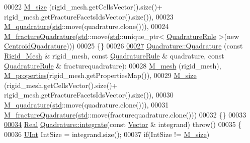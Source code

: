 \begin{DoxyCode}
00022     \hyperlink{classFVCode3D_1_1Quadrature_ae0ab248f031fa026887c4e1fb91a3835}{M\_size} (rigid\_mesh.getCellsVector().size()+ rigid\_mesh.getFractureFacetsIdsVector().size()),
00023     \hyperlink{classFVCode3D_1_1Quadrature_a9a128b9525429cca80435552ee3b6e56}{M\_quadrature}(\hyperlink{namespacestd}{std}::move(quadrature.clone())),
00024     \hyperlink{classFVCode3D_1_1Quadrature_afc75e45ee2a0a8be3cd39f93c2ef0b7e}{M\_fractureQuadrature}(\hyperlink{namespacestd}{std}::move(\hyperlink{namespacestd}{std}::unique\_ptr<
      \hyperlink{classFVCode3D_1_1QuadratureRule}{QuadratureRule} >(new \hyperlink{classFVCode3D_1_1CentroidQuadrature}{CentroidQuadrature})))
00025 \{\}
00026 
\hypertarget{Quadrature_8cpp_source.tex_l00027}{}\hyperlink{classFVCode3D_1_1Quadrature_a5f61238ba1001ac521cae0ec308b601f}{00027} \hyperlink{classFVCode3D_1_1Quadrature_aefb925716304b6546c5aeba01fab383a}{Quadrature::Quadrature} (\textcolor{keyword}{const} \hyperlink{classFVCode3D_1_1Rigid__Mesh}{Rigid\_Mesh} & rigid\_mesh, \textcolor{keyword}{const} 
      \hyperlink{classFVCode3D_1_1QuadratureRule}{QuadratureRule} & quadrature, \textcolor{keyword}{const} \hyperlink{classFVCode3D_1_1QuadratureRule}{QuadratureRule} & fracturequadrature):
00028     \hyperlink{classFVCode3D_1_1Quadrature_abaa2519ea32065df30242bd5f5cb2d01}{M\_mesh} (rigid\_mesh), \hyperlink{classFVCode3D_1_1Quadrature_ace6cd23087209d3186ae173c265cde39}{M\_properties}(rigid\_mesh.getPropertiesMap()),
00029     \hyperlink{classFVCode3D_1_1Quadrature_ae0ab248f031fa026887c4e1fb91a3835}{M\_size} (rigid\_mesh.getCellsVector().size()+ rigid\_mesh.getFractureFacetsIdsVector().size()),
00030     \hyperlink{classFVCode3D_1_1Quadrature_a9a128b9525429cca80435552ee3b6e56}{M\_quadrature}(\hyperlink{namespacestd}{std}::move(quadrature.clone())),
00031     \hyperlink{classFVCode3D_1_1Quadrature_afc75e45ee2a0a8be3cd39f93c2ef0b7e}{M\_fractureQuadrature}(\hyperlink{namespacestd}{std}::move(fracturequadrature.clone()))
00032 \{\}
00033 
\hypertarget{Quadrature_8cpp_source.tex_l00034}{}\hyperlink{classFVCode3D_1_1Quadrature_a6dfe290f1aa58ad93939df3180366cbc}{00034} \hyperlink{namespaceFVCode3D_a40c1f5588a248569d80aa5f867080e83}{Real} \hyperlink{classFVCode3D_1_1Quadrature_a6fc230221b791290d8f410fb8ebd3133}{Quadrature::integrate}(\textcolor{keyword}{const} \hyperlink{namespaceFVCode3D_a16ccf345652402bccd1a5d2e6782526c}{Vector} & integrand) \textcolor{keywordflow}{throw}()
00035 \{
00036     \hyperlink{namespaceFVCode3D_a4bf7e328c75d0fd504050d040ebe9eda}{UInt} IntSize = integrand.size();
00037     \textcolor{keywordflow}{if}(IntSize != \hyperlink{classFVCode3D_1_1Quadrature_ae0ab248f031fa026887c4e1fb91a3835}{M\_size})

\end{DoxyCode}
